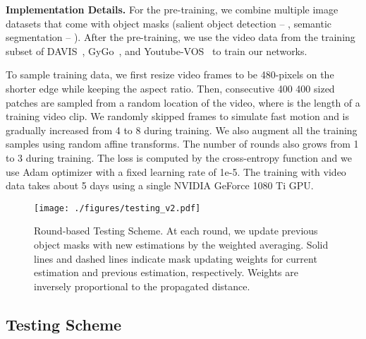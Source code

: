 \documentclass[10pt,twocolumn,letterpaper]{article}
\renewcommand{\paragraph}[1]{\vspace{1mm}\noindent\textbf{#1}}
\begin{document}
\paragraph{Implementation Details.}
For the pre-training, we combine multiple image datasets that come with object masks (salient object detection -- \cite{shi2016hierarchical, cheng2015global}, semantic segmentation -- \cite{everingham2010pascal, hariharan2011semantic, lin2014microsoft}). After the pre-training, we use the video data from the training subset of DAVIS~\cite{Pont-Tuset_arXiv_2017}, GyGo~\cite{GyGo}, and Youtube-VOS~\cite{xu2018youtube} to train our networks. 

To sample training data, we first resize video frames to be 480-pixels on the shorter edge while keeping the aspect ratio. 
Then,  consecutive 400  400 sized patches are sampled from a random location of the video, where  is the length of a training video clip. 
We randomly skipped frames to simulate fast motion and  is gradually increased from 4 to 8 during training. 
We also augment all the training samples using random affine transforms. 
The number of rounds also grows from 1 to 3 during training. 
The loss is computed by the cross-entropy function and we use Adam optimizer with a fixed learning rate of 1e-5. 
The training with video data takes about 5 days using a single NVIDIA GeForce 1080 Ti GPU.


\begin{figure}
\centering
\texttt{[image: ./figures/testing\_v2.pdf]}
\caption{Round-based Testing Scheme. At each round, we update previous object masks with new estimations by the weighted averaging. Solid lines and dashed lines indicate mask updating weights for current estimation and previous estimation, respectively. Weights are inversely proportional to the propagated distance.}
\label{Fig:testing}
\end{figure}


\subsection{Testing Scheme}
\end{document}
